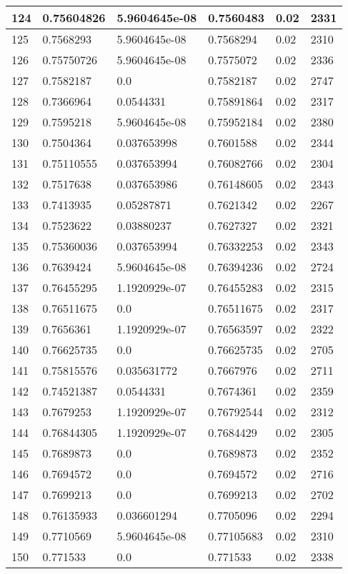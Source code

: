 \begin{longtable}{|l|l|l|l|l|l|}
124 & 0.75604826 & 5.9604645e-08 & 0.7560483 & 0.02 & 2331 \\ \hline 
125 & 0.7568293 & 5.9604645e-08 & 0.7568294 & 0.02 & 2310 \\ \hline 
126 & 0.75750726 & 5.9604645e-08 & 0.7575072 & 0.02 & 2336 \\ \hline 
127 & 0.7582187 & 0.0 & 0.7582187 & 0.02 & 2747 \\ \hline 
128 & 0.7366964 & 0.0544331 & 0.75891864 & 0.02 & 2317 \\ \hline 
129 & 0.7595218 & 5.9604645e-08 & 0.75952184 & 0.02 & 2380 \\ \hline 
130 & 0.7504364 & 0.037653998 & 0.7601588 & 0.02 & 2344 \\ \hline 
131 & 0.75110555 & 0.037653994 & 0.76082766 & 0.02 & 2304 \\ \hline 
132 & 0.7517638 & 0.037653986 & 0.76148605 & 0.02 & 2343 \\ \hline 
133 & 0.7413935 & 0.05287871 & 0.7621342 & 0.02 & 2267 \\ \hline 
134 & 0.7523622 & 0.03880237 & 0.7627327 & 0.02 & 2321 \\ \hline 
135 & 0.75360036 & 0.037653994 & 0.76332253 & 0.02 & 2343 \\ \hline 
136 & 0.7639424 & 5.9604645e-08 & 0.76394236 & 0.02 & 2724 \\ \hline 
137 & 0.76455295 & 1.1920929e-07 & 0.76455283 & 0.02 & 2315 \\ \hline 
138 & 0.76511675 & 0.0 & 0.76511675 & 0.02 & 2317 \\ \hline 
139 & 0.7656361 & 1.1920929e-07 & 0.76563597 & 0.02 & 2322 \\ \hline 
140 & 0.76625735 & 0.0 & 0.76625735 & 0.02 & 2705 \\ \hline 
141 & 0.75815576 & 0.035631772 & 0.7667976 & 0.02 & 2711 \\ \hline 
142 & 0.74521387 & 0.0544331 & 0.7674361 & 0.02 & 2359 \\ \hline 
143 & 0.7679253 & 1.1920929e-07 & 0.76792544 & 0.02 & 2312 \\ \hline 
144 & 0.76844305 & 1.1920929e-07 & 0.7684429 & 0.02 & 2305 \\ \hline 
145 & 0.7689873 & 0.0 & 0.7689873 & 0.02 & 2352 \\ \hline 
146 & 0.7694572 & 0.0 & 0.7694572 & 0.02 & 2716 \\ \hline 
147 & 0.7699213 & 0.0 & 0.7699213 & 0.02 & 2702 \\ \hline 
148 & 0.76135933 & 0.036601294 & 0.7705096 & 0.02 & 2294 \\ \hline 
149 & 0.7710569 & 5.9604645e-08 & 0.77105683 & 0.02 & 2310 \\ \hline 
150 & 0.771533 & 0.0 & 0.771533 & 0.02 & 2338 \\ \hline 
\end{longtable}